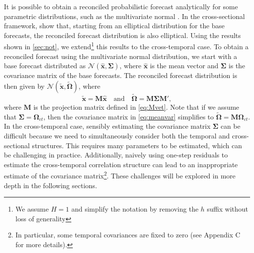 \documentclass[12pt]{article}
\newcommand{\xvet}{\bm{x}}
\newcommand{\Mvet}{\bm{M}}
\newcommand{\Omegavet}{\bm{\Omega}}
\newcommand{\Sigmavet}{\bm{\Sigma}}
\theoremstyle{definition}
\begin{document}
It is possible to obtain a reconciled probabilistic forecast analytically for some parametric distributions, such as the multivariate normal \citep{corani2021, eckert2021, panagiotelis2023, wickramasuriya2021b}. In the cross-sectional framework, \cite{panagiotelis2023} show that, starting from an elliptical distribution for the base forecasts, the reconciled forecast distribution is also elliptical. Using the results shown in \autoref{sec:not}, we extend\footnote{We assume $H =1$ and simplify the notation by removing the $h$ suffix without loss of generality} this results to the cross-temporal case. To obtain a reconciled forecast using the multivariate normal distribution, we start with a base forecast distributed as $\mathcal{N}(\widehat{\xvet}, \Sigmavet)$, where $\widehat{\xvet}$ is the mean vector and $\Sigmavet$ is the covariance matrix of the base forecasts. The reconciled forecast distribution is then given by $\mathcal{N}(\widetilde{\xvet}, \widetilde{\Omegavet})$, where
\begin{equation}\label{eq:meanvar}
	\widetilde{\xvet} = \Mvet\widehat{\xvet} \quad \mbox{and} \quad \widetilde{\Omegavet} = \Mvet \Sigmavet \Mvet',
\end{equation}
where $\Mvet$ is the projection matrix defined in \eqref{eq:Mvet}.
Note that if we assume that $\Sigmavet = \Omegavet_{ct}$, then the covariance matrix in \eqref{eq:meanvar} simplifies to $\widetilde{\Omegavet} = \Mvet \Omegavet_{ct}$. In the cross-temporal case, sensibly estimating the covariance matrix $\Sigmavet$ can be difficult because we need to simultaneously consider both the temporal and cross-sectional structures. This requires many parameters to be estimated, which can be challenging in practice. Additionally, naively using one-step residuals to estimate the cross-temporal correlation structure can lead to an inappropriate estimate of the covariance matrix\footnote{In particular, some temporal covariances are fixed to zero (see Appendix C for more details).}. These challenges will be explored in more depth in the following sections.


\end{document}
